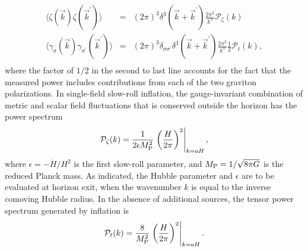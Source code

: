 \begin{eqnarray}
\langle\zeta(\vec{k})\zeta(\vec{k}^{\prime})\rangle&=&(2\pi)^3\delta^3(\vec{k}+\vec{k}^{\prime})\frac{2\pi^2}{k^3}\mathcal{P}_{\zeta}(k)\nonumber\\
\langle\gamma_\sigma(\vec{k})\gamma_{\sigma^{\prime}}(\vec{k}^{\prime})\rangle&=&(2\pi)^3\delta_{\sigma\sigma^{\prime}}\delta^3(\vec{k}+\vec{k}^{\prime})\frac{2\pi^2}{k^3}\frac{1}{2}\mathcal{P}_{t}(k),\nonumber\\
\end{eqnarray}
where the factor of $1/2$ in the second to last line accounts for the fact that the measured power includes contributions from each of the two graviton polarizations. In single-field slow-roll inflation, the gauge-invariant combination of metric and scalar field fluctuations that is conserved outside the horizon has the power spectrum
\begin{equation}
\label{eq:inf_Pzeta}
\mathcal{P}_{\zeta}(k)=\frac{1}{2\epsilon M_{\rm P}^2}\left.\left(\frac{H}{2\pi}\right)^2\right|_{k=aH},
\end{equation}
where $\epsilon=-\dot{H}/H^2$ is the first slow-roll parameter, and $M_{\rm P}=1/\sqrt{8\pi G}$ is the reduced Planck mass. As indicated, the Hubble parameter and $\epsilon$ are to be evaluated at horizon exit, when the wavenumber $k$ is equal to the inverse comoving Hubble radius. In the absence of additional sources, the tensor power spectrum generated by inflation is
\begin{equation}
\label{eq:inf_Pt}
\mathcal{P}_{t}(k)=\frac{8}{M_{\rm P}^2}\left.\left(\frac{H}{2\pi}\right)^2\right|_{k=aH}.
\end{equation}

